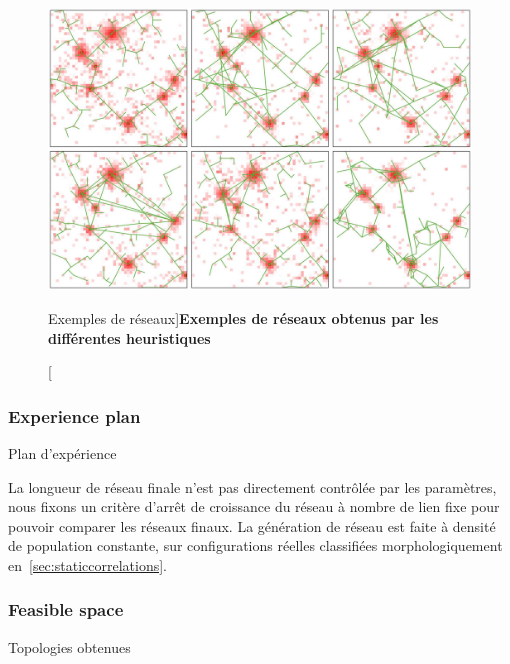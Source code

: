 \begin{figure}
	\includegraphics[width=\linewidth]{Figures/Final/7-1-2-fig-networkgrowth-examples.jpg}
\caption[Network examples][Exemples de réseaux]{\label{fig:networkgrowth:examples}}{\textbf{Exemples de réseaux obtenus par les différentes heuristiques}\label{fig:networkgrowth:examples}}
\end{figure}




\subsubsection{Experience plan}{Plan d'expérience}



La longueur de réseau finale n'est pas directement contrôlée par les paramètres, nous fixons un critère d'arrêt de croissance du réseau à nombre de lien fixe pour pouvoir comparer les réseaux finaux. La génération de réseau est faite à densité de population constante, sur configurations réelles classifiées morphologiquement en~\ref{sec:staticcorrelations}. 


\subsubsection{Feasible space}{Topologies obtenues}

